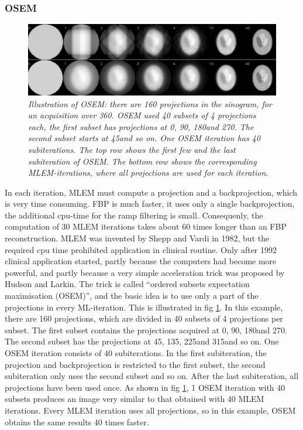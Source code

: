 \documentclass[11pt,oneside]{article}
\begin{document}
\subsubsection{OSEM} \label{sec:osem}
\begin{figure}[tb]
\centering
\includegraphics[width=\textwidth]{figs/fig_osem.pdf}
\caption{\label{fig:osem} \emph{Illustration of OSEM: there are 160
    projections in the sinogram, for an acquisition over
    360\textdegree. OSEM used 40 subsets of 4 projections each, the first
    subset has projections at 0\textdegree, 90\textdegree, 180\textdegree and
    270\textdegree. The second subset starts at 45\textdegree and so on. One
    OSEM iteration has 40 subiterations. The top row shows the first
    few and the last subiteration of OSEM. The bottom row shows the
    corresponding MLEM-iterations, where all projections are used for
    each iteration.}}
\end{figure}
In each iteration, MLEM must compute a projection and a
backprojection, which is very time consuming. FBP is much faster, it
uses only a single backprojection, the additional cpu-time for the
ramp filtering is small. Consequenly, the computation of 30 MLEM
iterations takes about 60 times longer than an FBP
reconstruction. MLEM was invented by Shepp and Vardi in 1982, but the
required cpu time prohibited application in clinical routine. Only
after 1992 clinical application started, partly because the computers
had become more powerful, and partly because a very simple
acceleration trick was proposed by Hudson and Larkin. The trick is
called ``ordered subsets expectation maximisation (OSEM)'', and the
basic idea is to use only a part of the projections in every
ML-iteration. This is illustrated in fig \ref{fig:osem}. In this
example, there are 160 projections, which are divided in 40 subsets of
4 projections per subset. The first subset contains the projections
acquired at 0\textdegree, 90\textdegree, 180\textdegree and 270\textdegree. The
second subset has the projections at 45\textdegree, 135\textdegree,
225\textdegree and 315\textdegree and so on. One OSEM iteration consists of
40 subiterations. In the first subiteration, the projection and
backprojection is restricted to the first subset, the second
subiteration only uses the second subset and so on. After the last
subiteration, all projections have been used once. As shown in fig
\ref{fig:osem}, 1 OSEM iteration with 40 subsets produces an image
very similar to that obtained with 40 MLEM iterations. Every MLEM
iteration uses all projections, so in this example, OSEM obtains the
same results 40 times faster.
\end{document}
